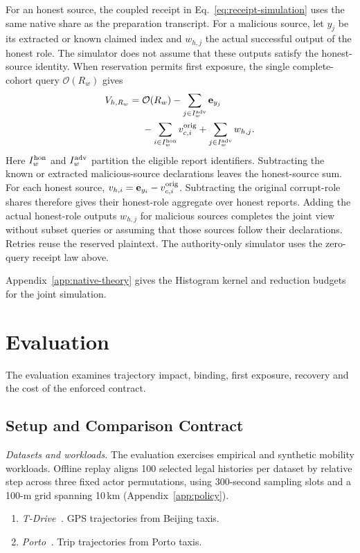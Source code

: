\documentclass[conference,compsoc]{IEEEtran}
\theoremstyle{definition}
\numberwithin{equation}{section}
\numberwithin{table}{section}
\numberwithin{figure}{section}
\theoremstyle{plain}
\begin{document}
For an honest source, the coupled receipt in Eq.~\eqref{eq:receipt-simulation}
uses the same native share as the preparation transcript. For a malicious
source, let \(y_j\) be its extracted or known claimed index and \(w_{h,j}\)
the actual successful output of the honest role. The simulator does not assume
that these outputs satisfy the honest-source identity. When reservation permits
first exposure, the single complete-cohort query \(\mathcal O(R_w)\) gives
\begin{equation}
\begin{split}
 V_{h,R_w}={}&\mathcal O(R_w)-\sum_{j\in I_w^{\rm adv}}\mathbf e_{y_j}\\
 &-\sum_{i\in I_w^{\rm hon}}v_{c,i}^{\rm orig}
 +\sum_{j\in I_w^{\rm adv}}w_{h,j}.
\end{split}
\label{eq:simulated-honest-export}
\end{equation}
Here \(I_w^{\rm hon}\) and \(I_w^{\rm adv}\) partition the eligible report identifiers. Subtracting the known or extracted malicious-source declarations
leaves the honest-source sum. For each honest source,
\(v_{h,i}=\mathbf e_{y_i}-v_{c,i}^{\rm orig}\). Subtracting the original
corrupt-role shares therefore gives their honest-role aggregate over honest reports. Adding the
actual honest-role outputs \(w_{h,j}\) for malicious sources completes the
joint view without subset queries or assuming that those sources follow their declarations.
Retries reuse the reserved plaintext. The authority-only simulator uses the zero-query receipt law above.

Appendix~\ref{app:native-theory} gives the Histogram kernel and reduction
budgets for the joint simulation.


\section{Evaluation}
\label{sec:evaluation}

The evaluation examines trajectory impact, binding, first exposure, recovery and the cost of the enforced contract.

\subsection{Setup and Comparison Contract}
\label{sec:eval-setup-summary}

\emph{Datasets and workloads.} The evaluation exercises empirical and synthetic mobility workloads. Offline replay aligns 100 selected legal histories per dataset by relative step across three fixed actor permutations, using 300-second sampling slots and a 100-m grid spanning 10\,km (Appendix~\ref{app:policy}).
\begin{enumerate}
\setlength{\itemsep}{0pt}\setlength{\parskip}{0pt}\setlength{\topsep}{0pt}
\item \emph{T-Drive~\cite{Yuan2010Tdrive}.} GPS trajectories from Beijing taxis.
\item \emph{Porto~\cite{MoreiraMatias2015Porto}.} Trip trajectories from Porto taxis.
\end{enumerate}
\end{document}
